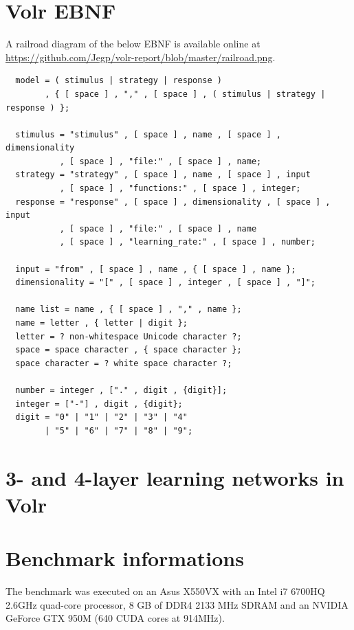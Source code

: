 \documentclass[a4paper,oneside]{memoir}
\begin{document}
\clearpage

\printglossary

\appendix

\chapter{Volr EBNF}
\label{ebnf}

A railroad diagram of the below EBNF is available online at
\url{https://github.com/Jegp/volr-report/blob/master/railroad.png}.

\begin{verbatim}
  model = ( stimulus | strategy | response )
        , { [ space ] , "," , [ space ] , ( stimulus | strategy | response ) };

  stimulus = "stimulus" , [ space ] , name , [ space ] , dimensionality
           , [ space ] , "file:" , [ space ] , name;
  strategy = "strategy" , [ space ] , name , [ space ] , input
           , [ space ] , "functions:" , [ space ] , integer;
  response = "response" , [ space ] , dimensionality , [ space ] , input
           , [ space ] , "file:" , [ space ] , name
           , [ space ] , "learning_rate:" , [ space ] , number;

  input = "from" , [ space ] , name , { [ space ] , name };
  dimensionality = "[" , [ space ] , integer , [ space ] , "]";

  name list = name , { [ space ] , "," , name };
  name = letter , { letter | digit };
  letter = ? non-whitespace Unicode character ?;
  space = space character , { space character };
  space character = ? white space character ?;

  number = integer , ["." , digit , {digit}];
  integer = ["-"] , digit , {digit};
  digit = "0" | "1" | "2" | "3" | "4"
        | "5" | "6" | "7" | "8" | "9";
\end{verbatim}

\clearpage

\chapter{3- and 4-layer learning networks in Volr}
\label{volr:example}



\chapter{Benchmark informations}
\label{env}
The benchmark was executed on an Asus X550VX with an Intel i7 6700HQ 2.6GHz
quad-core processor, 8 GB of DDR4 2133 MHz SDRAM and an NVIDIA GeForce GTX 950M
(640 CUDA cores at 914MHz).
\end{document}
